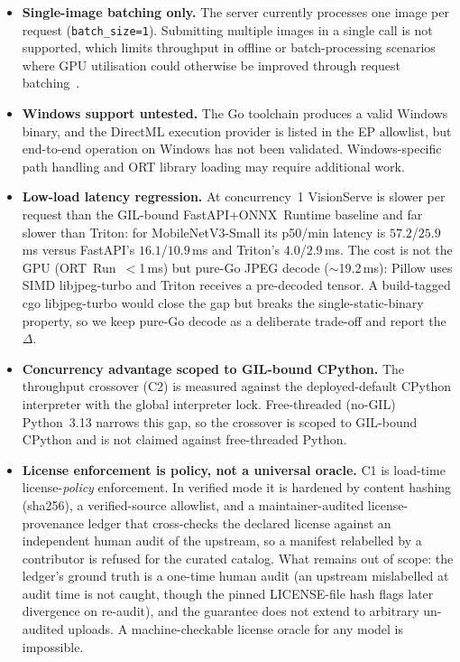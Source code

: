 \begin{itemize}
    \item \textbf{Single-image batching only.}
          The server currently processes one image per request (\texttt{batch\_size=1}).
          Submitting multiple images in a single call is not supported, which limits
          throughput in offline or batch-processing scenarios where GPU utilisation could
          otherwise be improved through request batching~\cite{nvidia2023triton}.

    \item \textbf{Windows support untested.}
          The Go toolchain produces a valid Windows binary, and the DirectML execution
          provider is listed in the EP allowlist, but end-to-end operation on Windows
          has not been validated. Windows-specific path handling and ORT library loading
          may require additional work.

    \item \textbf{Low-load latency regression.}
          At concurrency~1 VisionServe is slower per request than the GIL-bound
          FastAPI+ONNX~Runtime baseline and far slower than Triton: for
          MobileNetV3-Small its p50/min latency is $57.2$/$25.9$\,ms versus FastAPI's
          $16.1$/$10.9$\,ms and Triton's $4.0$/$2.9$\,ms. The cost is not the GPU
          (ORT~Run~$<$1\,ms) but pure-Go JPEG decode ($\sim$19.2\,ms): Pillow uses
          SIMD libjpeg-turbo and Triton receives a pre-decoded tensor. A build-tagged
          cgo libjpeg-turbo would close the gap but breaks the single-static-binary
          property, so we keep pure-Go decode as a deliberate trade-off and report the
          $\Delta$.

    \item \textbf{Concurrency advantage scoped to GIL-bound CPython.}
          The throughput crossover (C2) is measured against the deployed-default
          CPython interpreter with the global interpreter lock. Free-threaded (no-GIL)
          Python~3.13 narrows this gap, so the crossover is scoped to GIL-bound CPython
          and is not claimed against free-threaded Python.

    \item \textbf{License enforcement is policy, not a universal oracle.}
          C1 is load-time license-\emph{policy} enforcement. In verified mode it is hardened by
          content hashing (sha256), a verified-source allowlist, and a maintainer-audited
          license-provenance ledger that cross-checks the declared license against an independent
          human audit of the upstream, so a manifest relabelled by a contributor is refused for
          the curated catalog. What remains out of scope: the ledger's ground truth is a one-time
          human audit (an upstream mislabelled at audit time is not caught, though the
          pinned LICENSE-file hash flags later divergence on re-audit), and the guarantee does not
          extend to arbitrary un-audited uploads. A machine-checkable license oracle for any
          model is impossible.


\end{itemize}
